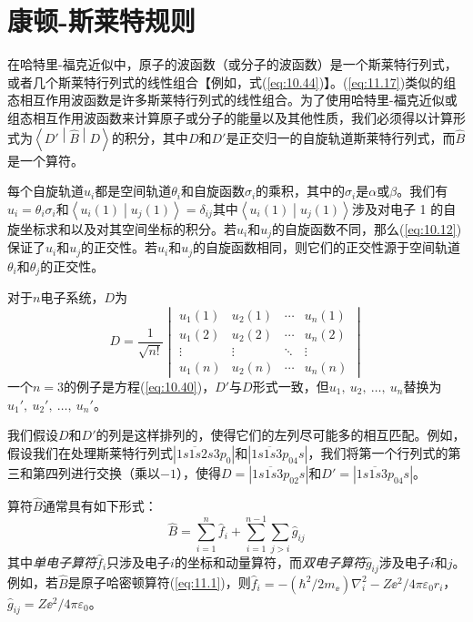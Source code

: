 \section{康顿-斯莱特规则}
\label{sec:11.8 The Condon-Slater Rules}

    在哈特里-福克近似中，原子的波函数（或分子的波函数）是一个斯莱特行列式，或者几个斯莱特行列式的线性组合【例如，式(\ref{eq:10.44})】。(\ref{eq:11.17})类似的组态相互作用波函数是许多斯莱特行列式的线性组合。为了使用哈特里-福克近似或组态相互作用波函数来计算原子或分子的能量以及其他性质，我们必须得以计算形式为$\left\langle D' \middle| \hat{B} \middle| D \right\rangle$的积分，其中$D$和$D'$是正交归一的自旋轨道斯莱特行列式，而$\hat{B}$是一个算符。

    每个自旋轨道$u_i$都是空间轨道$\theta_i$和自旋函数$\sigma_i$的乘积，其中的$\sigma_i$是$\alpha$或$\beta$。我们有$u_i = \theta_i\sigma_i$和$\left\langle u_i\left(1\right) \middle| u_j\left(1\right) \right\rangle = \delta_{ij}$其中$\left\langle u_i\left(1\right) \middle| u_j\left(1\right) \right\rangle$涉及对电子 1 的自旋坐标求和以及对其空间坐标的积分。若$u_i$和$u_j$的自旋函数不同，那么(\ref{eq:10.12})保证了$u_i$和$u_j$的正交性。若$u_i$和$u_j$的自旋函数相同，则它们的正交性源于空间轨道$\theta_i$和$\theta_j$的正交性。

    对于$n$电子系统，$D$为
    \begin{equation}
        D = \frac{1}{\sqrt{n!}}\begin{vmatrix}
            u_1\left(1\right) & u_2\left(1\right) & \cdots & u_n\left(1\right) \\
            u_1\left(2\right) & u_2\left(2\right) & \cdots & u_n\left(2\right) \\
            \vdots & \vdots & \ddots & \vdots \\
            u_1\left(n\right) & u_2\left(n\right) & \cdots & u_n\left(n\right)
        \end{vmatrix}
        \label{eq:11.76}
    \end{equation}
    一个$n=3$的例子是方程(\ref{eq:10.40})，$D'$与$D$形式一致，但$u_1,\:u_2,\:\ldots,\:u_n$替换为$u_1',\:u_2',\:\ldots,\:u_n'$。

    我们假设$D$和$D'$的列是这样排列的，使得它们的左列尽可能多的相互匹配。例如，假设我们在处理斯莱特行列式$\left|1s\overline{1s}2s3p_0\right|$和$\left|1s\overline{1s}3p_04s\right|$，我们将第一个行列式的第三和第四列进行交换（乘以$-1$），使得$D = \left|1s\overline{1s}3p_02s\right|$和$D' = \left|1s\overline{1s}3p_04s\right|$。

    算符$\hat{B}$通常具有如下形式：
    \begin{equation}
        \hat{B} = \sum_{i=1}^{n} \hat{f}_i + \sum_{i=1}^{n-1} \sum_{j>i} \hat{g}_{ij}
        \label{eq:11.77}
    \end{equation}
    其中\textit{单电子算符}$\hat{f}_i$只涉及电子$i$的坐标和动量算符，而\textit{双电子算符}$\hat{g}_{ij}$涉及电子$i$和$j$。例如，若$\hat{B}$是原子哈密顿算符(\ref{eq:11.1})，则$\hat{f}_i = -(\hbar^2/2m_{\ee }) \nabla_i^2 - Z\ee ^2/4\pi\varepsilon_0r_i$，$\hat{g}_{ij} = Z\ee ^2/4\pi\varepsilon_0$。

